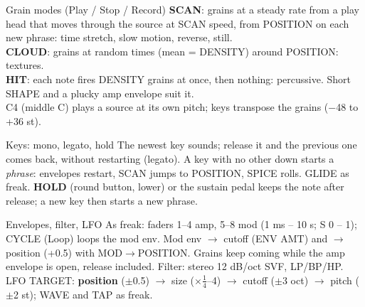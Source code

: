 \documentclass{article}
\newcommand{\GR}[1]{\textcolor{grc}{#1}}
\begin{document}
\begin{minipage}[t]{68mm}\vspace{0pt}
\begin{card}{Grain modes (Play / Stop / Record)}
\GR{\textbf{SCAN}}: grains at a steady rate from a play head that moves through the source at SCAN speed,
from POSITION on each new phrase: time stretch, slow motion, reverse, still.\\[0.4mm]
\GR{\textbf{CLOUD}}: grains at random times (mean = DENSITY) around POSITION: textures.\\[0.4mm]
\GR{\textbf{HIT}}: each note fires DENSITY grains at once, then nothing: percussive. Short SHAPE and a
plucky amp envelope suit it.\\[0.4mm]
C4 (middle C) plays a source at its own pitch; keys transpose the grains (\(-\)48 to +36 st).
\end{card}
\begin{card}{Keys: mono, legato, hold}
The newest key sounds; release it and the previous one comes back, without restarting (legato).
A key with no other down starts a \emph{phrase}: envelopes restart, SCAN jumps to POSITION,
SPICE rolls. GLIDE as freak. \textbf{HOLD} (round button, lower) or the sustain pedal keeps the note
after release; a new key then starts a new phrase.
\end{card}
\begin{card}{Envelopes, filter, LFO}
As freak: faders 1--4 amp, 5--8 mod (1 ms -- 10 s; S 0 -- 1); CYCLE (Loop) loops the mod env.
Mod env \(\to\) cutoff (ENV AMT) and \(\to\) position (+0.5) with MOD\(\to\)POSITION. Grains keep coming
while the amp envelope is open, release included.
Filter: stereo 12 dB/oct SVF, LP/BP/HP. LFO TARGET: \textbf{position} (\(\pm\)0.5) \(\to\) size (\(\times\frac14\)--4)
\(\to\) cutoff (\(\pm\)3 oct) \(\to\) pitch (\(\pm\)2 st); WAVE and TAP as freak.
\end{card}
\end{minipage}\hfill
\end{document}
